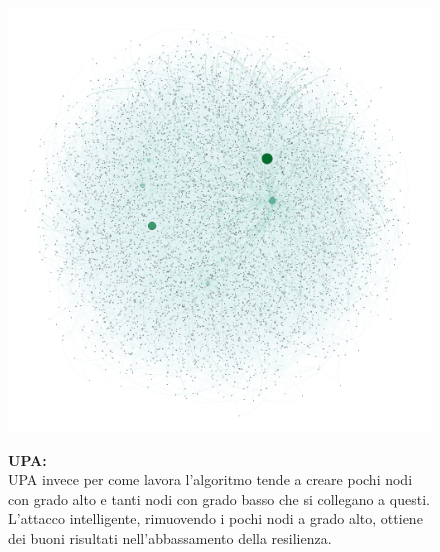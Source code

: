 \documentclass{article}
\begin{document}
\begin{figure}[H]
	\begin{minipage}{0.5\linewidth}
		\centering
		\includegraphics[width=0.9\linewidth, valign=t]{figures/UPA}
	\end{minipage}
	\begin{minipage}{0.55\linewidth}
		\textbf{UPA:}\\
		UPA invece per come lavora l'algoritmo tende a creare pochi nodi con grado alto e tanti nodi con grado basso che si collegano a questi.\\
		L'attacco intelligente, rimuovendo i pochi nodi a grado alto, ottiene dei buoni risultati nell'abbassamento della resilienza.\\
	\end{minipage}
\end{figure}
\end{document}
